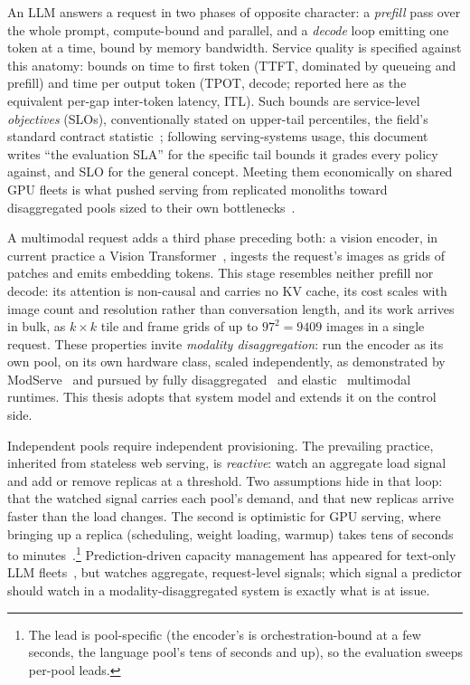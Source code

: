An LLM answers a request in two phases of opposite character: a
\emph{prefill} pass over the whole prompt, compute-bound and parallel, and a
\emph{decode} loop emitting one token at a time, bound by memory bandwidth.
Service quality is specified against this anatomy: bounds on time to first
token (TTFT, dominated by
queueing and prefill) and time per output token (TPOT, decode; reported here
as the equivalent per-gap inter-token latency, ITL). Such bounds are
service-level \emph{objectives} (SLOs), conventionally stated on upper-tail
percentiles, the field's standard contract
statistic~\cite{Dean2013TailAtScale,DeCandia2007Dynamo}; following
serving-systems usage,
this document writes ``the evaluation SLA'' for the specific tail bounds it
grades every policy against, and SLO for the general concept. Meeting them
economically on shared GPU fleets is what pushed serving from replicated
monoliths toward disaggregated pools sized to their own
bottlenecks~\cite{Qin2025Mooncake}.

A multimodal request adds a third phase preceding both: a vision encoder,
in current practice a Vision Transformer~\cite{Dosovitskiy2021ViT}, ingests
the request's images as grids of patches and emits embedding tokens. This
stage resembles neither prefill nor decode: its attention is non-causal
and carries no KV cache, its cost scales with image count and resolution
rather than conversation length, and its work arrives in bulk, as $k\times
k$ tile and frame grids of up to $97^2=\num{9409}$ images in a single
request. These properties invite \emph{modality disaggregation}: run the
encoder as its own pool, on its own hardware class, scaled independently, as
demonstrated by ModServe~\cite{Qiu2025ModServe} and pursued by fully
disaggregated~\cite{vLLMOmni2026} and elastic~\cite{Liu2025ElasticMM}
multimodal runtimes. This thesis adopts that system model and extends it on
the control side.

Independent pools require independent provisioning. The prevailing practice,
inherited from stateless web serving, is \emph{reactive}: watch an aggregate
load signal and add or remove replicas at a threshold. Two assumptions hide
in that loop: that the watched signal carries each pool's demand, and
that new replicas arrive faster than the load changes. The second is
optimistic for GPU serving,
where bringing up a replica (scheduling, weight loading, warmup) takes tens
of seconds to minutes~\cite{Fu2024ServerlessLLM}.\footnote{The lead is
pool-specific (the encoder's is orchestration-bound at a few seconds, the
language pool's tens of seconds and up), so the evaluation sweeps
per-pool leads.} Prediction-driven capacity management has appeared for
text-only LLM fleets~\cite{Jaiswal2025SageServe,WarmServe2025}, but watches
aggregate, request-level signals; which signal a predictor should watch in a
modality-disaggregated system is exactly what is at issue.

